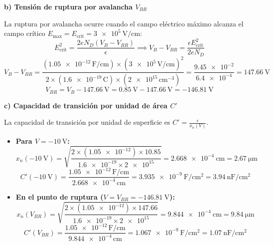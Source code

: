 \begin{problema}
\textbf{b) Tensión de ruptura por avalancha $V_{BR}$}

La ruptura por avalancha ocurre cuando el campo eléctrico máximo alcanza el campo crítico $E_{\max} = E_{\text{crit}} = \SI{3e5}{\V\per\cm}$:
\[
E_{\text{crit}}^2 = \frac{2 e N_D (V_B - V_{BR})}{\epsilon} \implies V_B - V_{BR} = \frac{\epsilon E_{\text{crit}}^2}{2 e N_D}
\]
\[
V_B - V_{BR} = \frac{(\num{1.05e-12}\,\text{F/cm}) \times (\num{3e5}\,\text{V/cm})^2}{2 \times (\num{1.6e-19}\,\text{C}) \times (\num{2e15}\,\text{cm}^{-3})} = \frac{\num{9.45e-2}}{\num{6.4e-4}} = \SI{147.66}{\V}
\]
\[
V_{BR} = V_B - \SI{147.66}{\V} = \SI{0.85}{\V} - \SI{147.66}{\V} = \SI{-146.81}{\V}
\]

\textbf{c) Capacidad de transición por unidad de área $C'$}

La capacidad de transición por unidad de superficie es $C' = \frac{\epsilon}{x_n(V)}$.

\begin{itemize}
    \item \textbf{Para $V = \SI{-10}{\V}$:}
    \[
    x_n(\SI{-10}{\V}) = \sqrt{\frac{2 \times (\num{1.05e-12}) \times 10.85}{\num{1.6e-19} \times \num{2e15}}} = \SI{2.668e-4}{\cm} = \SI{2.67}{\um}
    \]
    \[
    C'(\SI{-10}{\V}) = \frac{\num{1.05e-12}\,\text{F/cm}}{\num{2.668e-4}\,\text{cm}} = \SI{3.935e-9}{\farad\per\cm^2} = \SI{3.94}{\nano\farad\per\cm^2}
    \]

    \item \textbf{En el punto de ruptura ($V = V_{BR} = \SI{-146.81}{\V}$):}
    \[
    x_n(V_{BR}) = \sqrt{\frac{2 \times (\num{1.05e-12}) \times 147.66}{\num{1.6e-19} \times \num{2e15}}} = \SI{9.844e-4}{\cm} = \SI{9.84}{\um}
    \]
    \[
    C'(V_{BR}) = \frac{\num{1.05e-12}\,\text{F/cm}}{\num{9.844e-4}\,\text{cm}} = \SI{1.067e-9}{\farad\per\cm^2} = \SI{1.07}{\nano\farad\per\cm^2}
    \]
\end{itemize}
\end{problema}

